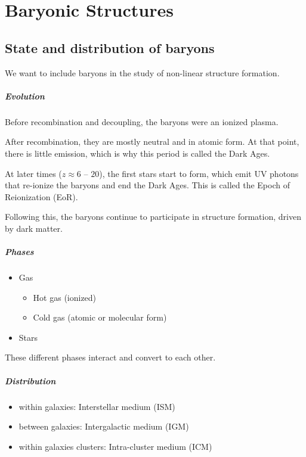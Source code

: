 \chapter{Baryonic Structures}


\section{State and distribution of baryons}


We want to include baryons in the study of non-linear structure formation.


\paragraph{Evolution}
Before recombination and decoupling, the baryons were an ionized plasma.

After recombination, they are mostly neutral and in atomic form. At that point, there is little emission, which is why this period is called the Dark Ages.

At later times ($z \approx 6$ -- $20$), the first stars start to form, which emit UV photons that re-ionize the baryons and end the Dark Ages. This is called the Epoch of Reionization (EoR).

Following this, the baryons continue to participate in structure formation, driven by dark matter.


\paragraph{Phases}
\begin{itemize}
	\item Gas
	\begin{itemize}
		\item Hot gas (ionized)
		\item Cold gas (atomic or molecular form)
	\end{itemize}
	\item Stars
\end{itemize}
These different phases interact and convert to each other.


\paragraph{Distribution}
\begin{itemize}
	\item within galaxies: Interstellar medium (ISM)
	\item between galaxies: Intergalactic medium (IGM)
	\item within galaxies clusters: Intra-cluster medium (ICM)
\end{itemize}



